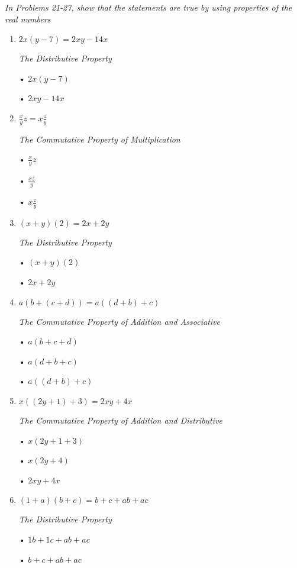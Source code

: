 \documentclass{article}
\begin{document}
\textit{In Problems 21-27, show that the statements are true by using properties of the real numbers}
\begin{enumerate}[start=21]
    \item $2x(y-7) = 2xy - 14x$\par
    \begin{center}
        \textit{The Distributive Property}\par
        • $2x(y-7)$\par
        • $2xy - 14x$
    \end{center}

    \item $\frac{x}{y}z = x\frac{z}{y}$
    \begin{center}
        \textit{The Commutative Property of Multiplication}\par
        • $\frac{x}{y} z$\par
        • $\frac{xz}{y}$\par
        • $x \frac{z}{y}$
    \end{center}

    \item $(x + y)(2) = 2x + 2y$
    \begin{center}
        \textit{The Distributive Property}\par
        • $(x + y)(2)$\par
        • $2x + 2y$
    \end{center}
    
    \item $a(b + (c + d)) = a((d + b) + c)$
    \begin{center}
        \textit{The Commutative Property of Addition and Associative}\par
        • $a(b + c + d)$\par
        • $a(d + b + c)$\par
        • $a((d + b) + c)$
    \end{center}

    \item $x((2y + 1) + 3) = 2xy + 4x$
    \begin{center}
        \textit{The Commutative Property of Addition and Distributive}\par
        • $x(2y + 1 + 3)$\par
        • $x(2y + 4)$\par
        • $2xy + 4x$
    \end{center}
    
    \item $(1 + a)(b + c) = b + c + ab + ac$
    \begin{center}
        \textit{The Distributive Property}\par
        • $1b + 1c + ab + ac$\par
        • $b + c + ab + ac$
    \end{center}


\end{enumerate}
\end{document}

